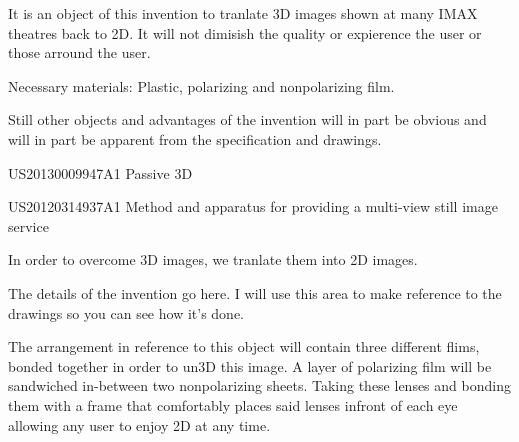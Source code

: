 \documentclass[english]{uspatent}
\begin{document}
\patentParagraph It is an object of this invention to tranlate 3D images shown at many
IMAX theatres back to 2D. It will not dimisish the quality or expierence the user or those
arround the user. 

\patentParagraph Necessary materials: Plastic, polarizing and nonpolarizing film.

\patentParagraph Still other objects and advantages of the invention will in part be obvious and will in part be apparent from the specification and drawings.


\patentParagraph US20130009947A1 Passive 3D 

\patentParagraph US20120314937A1 Method and apparatus for providing a multi-view still image 
service


\patentParagraph In order to overcome 3D images, we tranlate them into 2D images. 




\patentParagraph The details of the invention go here. I will use this area to make reference to the drawings so you can see how it's done.

\patentParagraph The arrangement in reference to this object will contain three different flims,
bonded together in order to un3D this image. A layer of polarizing film will be sandwiched
in-between two nonpolarizing sheets. Taking these lenses and bonding them with a frame that 
comfortably places said lenses infront of each eye allowing any user to enjoy 2D at any time. 
\end{document}
